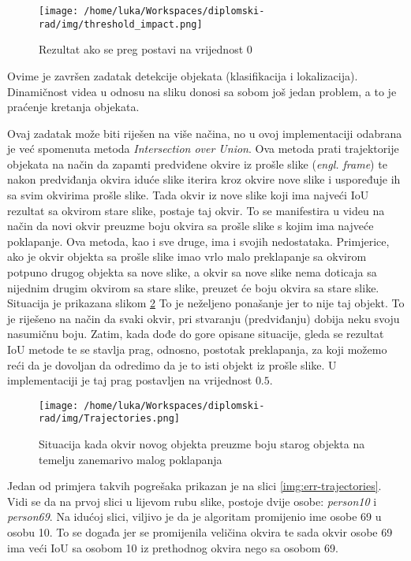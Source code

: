 \begin{figure}[htp]
	\centering
	\texttt{[image: /home/luka/Workspaces/diplomski-rad/img/threshold\_impact.png]}
	\caption{Rezultat ako se preg postavi na vrijednost 0 \citep{YOLO}}
	\label{img:threshold-impact}
\end{figure}

\bigskip
Ovime je završen zadatak detekcije objekata (klasifikacija i lokalizacija). Dinamičnost videa u odnosu na sliku donosi sa sobom još jedan problem, a to je praćenje kretanja objekata. 
\bigskip

Ovaj zadatak može biti riješen na više načina, no u ovoj implementaciji odabrana je već spomenuta metoda \textit{Intersection over Union}. Ova metoda prati trajektorije objekata na način da zapamti predviđene okvire iz prošle slike (\textit{engl. frame}) te nakon predviđanja okvira iduće slike iterira kroz okvire nove slike i uspoređuje ih sa svim okvirima prošle slike. Tada okvir iz nove slike koji ima najveći IoU rezultat sa okvirom stare slike, postaje taj okvir. To se manifestira u videu na način da novi okvir preuzme boju okvira sa prošle slike s kojim ima najveće poklapanje. Ova metoda, kao i sve druge, ima i svojih nedostataka. Primjerice, ako je okvir objekta sa prošle slike imao vrlo malo preklapanje sa okvirom potpuno drugog objekta sa nove slike, a okvir sa nove slike nema doticaja sa nijednim drugim okvirom sa stare slike, preuzet će boju okvira sa stare slike. Situacija je prikazana slikom \ref{img:trajectories1} To je neželjeno ponašanje jer to nije taj objekt. To je riješeno na način da svaki okvir, pri stvaranju (predviđanju) dobija neku svoju nasumičnu boju. Zatim, kada dođe do gore opisane situacije, gleda se rezultat IoU metode te se stavlja prag, odnosno, postotak preklapanja, za koji možemo reći da je dovoljan da odredimo da je to isti objekt iz prošle slike. U implementaciji je taj prag postavljen na vrijednost $0.5$. 

\begin{figure}[htp]
	\centering
	\texttt{[image: /home/luka/Workspaces/diplomski-rad/img/Trajectories.png]}
	\caption{Situacija kada okvir novog objekta preuzme boju starog objekta na temelju zanemarivo malog poklapanja}
	\label{img:trajectories1}
\end{figure}

Jedan od primjera takvih pogrešaka prikazan je na slici \ref{img:err-trajectories}. Vidi se da na prvoj slici u lijevom rubu slike, postoje dvije osobe: \textit{person10} i \textit{person69}. Na idućoj slici, viljivo je da je algoritam promijenio ime osobe 69 u osobu 10. To se događa jer se promijenila veličina okvira te sada okvir osobe 69 ima veći IoU sa osobom 10 iz prethodnog okvira nego sa osobom 69.

